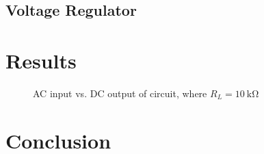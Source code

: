 \documentclass{article}
\begin{document}

\subsection{Voltage Regulator}
\label{sec:volt_reg}


\section{Results}
\label{sec:results}

\begin{figure}[hbtp]
  \centering
  
  \caption{\label{fig:rect_vp_vdc} AC input vs. DC output of circuit, where $R_L=\SI{10}{\kilo\ohm}$}
\end{figure}

\section{Conclusion}
\label{sec:conclusion}

\end{document}
